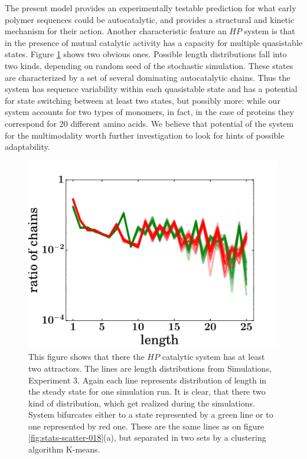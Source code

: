 \documentclass[journal=jacsat,manuscript=article,layout=twocolumn]{achemso}
\begin{document}
  The present model provides an experimentally testable prediction for what early 
  polymer sequences could be autocatalytic, and provides a structural and kinetic mechanism for 
their action. 
Another characteristic 
feature an $HP$ system is that in the presence of mutual catalytic activity has a capacity for 
multiple quasistable states. Figure \ref{fig:distr1837-dyn} shows two obvious ones. Possible 
length distributions fall into two kinds, depending on random seed of the stochastic simulation. 
These states are characterized by a set of several dominating autocatalytic chains. Thus the 
system has sequence variability within each quasistable state and has a potential for state 
switching between at least two states, but possibly more: while our system accounts for two 
types of monomers, in fact, in the case of proteins they correspond for 20 different amino acids. 
We believe that potential of the system for the multimodality worth further investigation to look 
for hints of possible adaptability.
\begin{figure}[h!]
  \centering
  \includegraphics[width=0.9\columnwidth]{pictures/distr1837-dynamics.pdf}
  \caption{\footnotesize{\textbf{} This figure shows that there the $HP$ catalytic system has at 
least two attractors. The lines are length distributions from Simulations, Experiment 3. Again each 
line represents distribution of length in the steady state for one simulation run. It is clear, 
that there two kind of distribution, which get realized during the simulations. System bifurcates 
either to a state represented by a green line or to one represented by red one. These are the 
same lines as on figure \ref{fig:stats-scatter-018}(a), but separated in two sets by a clustering 
algorithm K-means.}}
  \label{fig:distr1837-dyn}
\end{figure}
\end{document}
